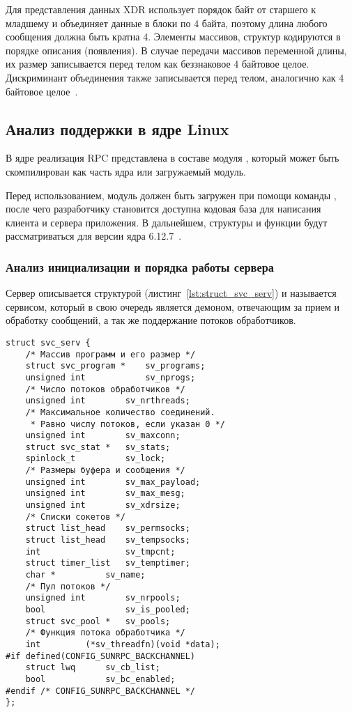 Для представления данных XDR использует порядок байт от старшего к младшему и
объединяет данные в блоки по 4 байта, поэтому длина любого сообщения должна
быть кратна 4. Элементы массивов, структур кодируются в порядке описания
(появления). В случае передачи массивов переменной длины, их размер
записывается перед телом как беззнаковое 4 байтовое целое. Дискриминант
объединения также записывается перед телом, аналогично как 4 байтовое
целое~\cite{rfc4506}.

\subsection{Анализ поддержки в ядре Linux}

В ядре реализация RPC представлена в составе модуля , который
может быть скомпилирован как часть ядра или загружаемый модуль.

Перед использованием, модуль должен быть загружен при помощи команды
, после чего разработчику становится доступна кодовая
база для написания клиента и сервера приложения. В дальнейшем, структуры и
функции будут рассматриваться для версии ядра 6.12.7~\cite{LinuxKernel6127}.

\subsubsection{Анализ инициализации и порядка работы сервера}

Сервер описывается структурой 
(листинг~\ref{lst:struct_svc_serv}) и называется сервисом, который в свою
очередь является демоном, отвечающим за прием и обработку сообщений, а так же
поддержание потоков обработчиков.

\begin{lstlisting}[caption={Структура сервиса}, label={lst:struct_svc_serv}]
struct svc_serv {
    /* Массив программ и его размер */
    struct svc_program *    sv_programs;
    unsigned int            sv_nprogs;
    /* Число потоков обработчиков */
    unsigned int        sv_nrthreads;
    /* Максимальное количество соединений.
     * Равно числу потоков, если указан 0 */
    unsigned int        sv_maxconn;
    struct svc_stat *   sv_stats;
    spinlock_t          sv_lock;
    /* Размеры буфера и сообщения */
    unsigned int        sv_max_payload;
    unsigned int        sv_max_mesg;
    unsigned int        sv_xdrsize;
    /* Списки сокетов */
    struct list_head    sv_permsocks;
    struct list_head    sv_tempsocks;
    int                 sv_tmpcnt;
    struct timer_list   sv_temptimer;
    char *          sv_name;
    /* Пул потоков */
    unsigned int        sv_nrpools;
    bool                sv_is_pooled;
    struct svc_pool *   sv_pools;
    /* Функция потока обработчика */
    int         (*sv_threadfn)(void *data);
#if defined(CONFIG_SUNRPC_BACKCHANNEL)
    struct lwq      sv_cb_list;
    bool            sv_bc_enabled;
#endif /* CONFIG_SUNRPC_BACKCHANNEL */
};
\end{lstlisting}

